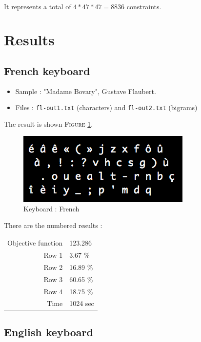 \documentclass[a4paper,titlepage]{article}
\begin{document}
\paragraph{}
It represents a total of $4 * 47 * 47 = 8836$ constraints.

\section{Results}

	\subsection{French keyboard}

\begin{itemize}
	\item Sample : "Madame Bovary", Gustave Flaubert.
	\item Files : \texttt{fl-out1.txt} (characters) and \texttt{fl-out2.txt} (bigrams)
\end{itemize}
The result is shown \textsc{Figure} \ref{french}.
\begin{figure}[h]
	\centering
	\includegraphics[scale=1]{images/Francais.png}
	\caption{Keyboard : French}
	\label{french}
\end{figure}

There are the numbered results : 
\begin{center}
	\begin{tabular}{r|l}
		Objective function & 123.286\\
		Row 1 & 3.67 \%\\
		Row 2 & 16.89 \%\\
		Row 3 & 60.65 \%\\
		Row 4 & 18.75 \%\\
		Time & 1024 sec
	\end{tabular}
\end{center}

	\subsection{English keyboard}
\end{document}
